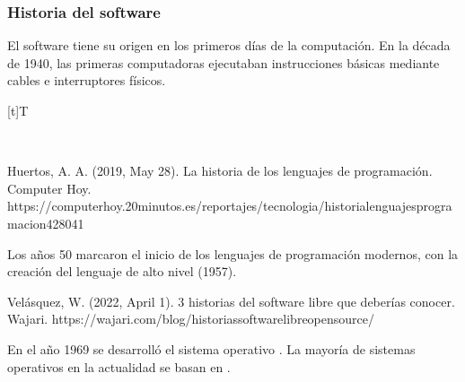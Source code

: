 \documentclass[letterpaper,10pt,spanish]{sphinxmanual}
\let\sphinxpxdimen\pdfpxdimen\else\newdimen\sphinxpxdimen
\begin{document}
\subsubsection{Historia del software}
\label{\detokenize{1_guias/10informatica/G1001:historia-del-software}}
\sphinxAtStartPar
El software tiene su origen en los primeros días de la computación. En la década de 1940, las primeras computadoras ejecutaban instrucciones básicas mediante cables e interruptores físicos.


\begin{savenotes}\sphinxattablestart
\sphinxthistablewithglobalstyle
\centering
\begin{tabulary}{\linewidth}[t]{T}
\sphinxtoprule
\sphinxtableatstartofbodyhook

\begin{sphinxfigure-in-table}
\centering
\capstart
\noindent\sphinxincludegraphics[width=600\sphinxpxdimen]{{image07}.png}
\label{\detokenize{1_guias/10informatica/G1001:id32}}\end{sphinxfigure-in-table}\relax
\\
\sphinxbottomrule
\end{tabulary}
\sphinxtableafterendhook\par
\sphinxattableend\end{savenotes}

\sphinxAtStartPar
%
\begin{footnote}[10]\sphinxAtStartFootnote
Huertos, A. A. (2019, May 28). La historia de los lenguajes de programación. Computer Hoy. https://computerhoy.20minutos.es/reportajes/tecnologia/historia\sphinxhyphen{}lenguajes\sphinxhyphen{}programacion\sphinxhyphen{}428041
%
\end{footnote} Los años 50 marcaron el inicio de los lenguajes de programación modernos, con la creación del lenguaje de alto nivel  (1957).

\sphinxAtStartPar
%
\begin{footnote}[11]\sphinxAtStartFootnote
Velásquez, W. (2022, April 1). 3 historias del software libre que deberías conocer. Wajari. https://wajari.com/blog/historias\sphinxhyphen{}software\sphinxhyphen{}libre\sphinxhyphen{}open\sphinxhyphen{}source/
%
\end{footnote} En el año 1969 se desarrolló el sistema operativo . La mayoría de sistemas operativos en la actualidad se basan en .
\end{document}
